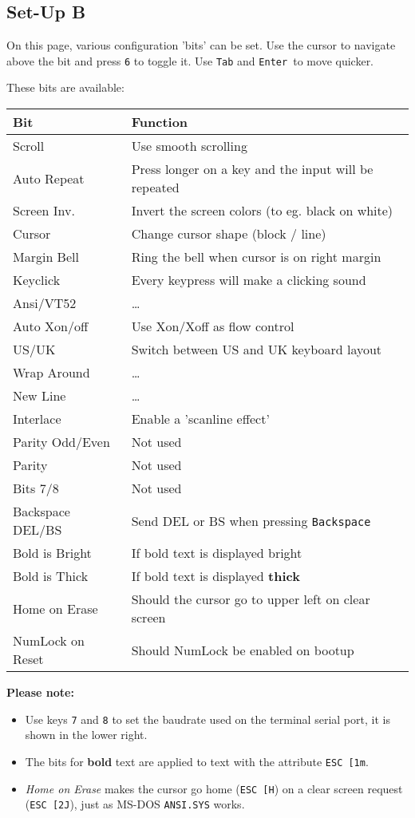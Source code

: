 \subsection{Set-Up B}

On this page, various configuration 'bits' can be set. Use the cursor to navigate above the bit and press \texttt{6} to toggle it. Use \texttt{Tab} and \texttt{Enter }to move quicker.

These bits are available:

\begin{tabular}{p{8em} | p{}}
\hline
\textbf{Bit} & \textbf{Function} \\
\hline
Scroll      & Use smooth scrolling \\
Auto Repeat & Press longer on a key and the input will be repeated \\
Screen Inv. & Invert the screen colors (to eg. black on white) \\
Cursor      & Change cursor shape (block / line) \\
\hline
Margin Bell & Ring the bell when cursor is on right margin \\
Keyclick    & Every keypress will make a clicking sound \\
Ansi/VT52   & \dots \\
Auto Xon/off    & Use Xon/Xoff as flow control \\
\hline
US/UK       & Switch between US and UK keyboard layout \\
Wrap Around & \dots \\
New Line    & \dots \\
Interlace   & Enable a 'scanline effect' \\
\hline
Parity Odd/Even & Not used \\
Parity          & Not used \\
Bits 7/8        & Not used \\
Backspace DEL/BS & Send DEL or BS when pressing \texttt{Backspace} \\
\hline
Bold is Bright  & If bold text is displayed bright \\
Bold is Thick   & If bold text is displayed \textbf{thick} \\
Home on Erase   & Should the cursor go to upper left on clear screen \\
NumLock on Reset & Should NumLock be enabled on bootup \\
\hline
\end{tabular}

\newpage
\textbf{Please note:}
\begin{itemize}
 \item Use keys \texttt{7} and \texttt{8} to set the baudrate used on the terminal serial port, it is shown in the lower right.
 \item The bits for \textbf{bold} text are applied to text with the attribute \texttt{ESC [1m}.
 \item \textit{Home on Erase} makes the cursor go home (\texttt{ESC [H}) on a clear screen request (\texttt{ESC [2J}), just as MS-DOS \texttt{ANSI.SYS} works.
\end{itemize}


